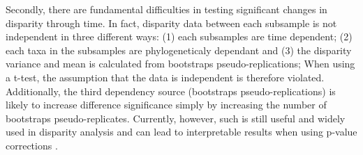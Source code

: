 \documentclass[12pt,letterpaper]{article}
\begin{document}
Secondly, there are fundamental difficulties in testing significant changes in disparity through time.
In fact, disparity data between each subsample is not independent in three different ways: (1) each subsamples are time dependent; (2) each taxa in the subsamples are phylogeneticaly dependant and (3) the disparity variance and mean is calculated from bootstraps pseudo-replications; 
When using a t-test, the assumption that the data is independent is therefore violated.
Additionally, the third dependency source (bootstraps pseudo-replications) is likely to increase difference significance simply by increasing the number of bootstraps pseudo-replicates.
Currently, however, such is still useful and widely used in disparity analysis \citep[e.g.]{anderson2012using,zelditch2012geometric,smith2014joined} and can lead to interpretable results when using p-value corrections \citep[e.g. Holm-Bonferonni][]{holm1979simple}.

\end{document}
